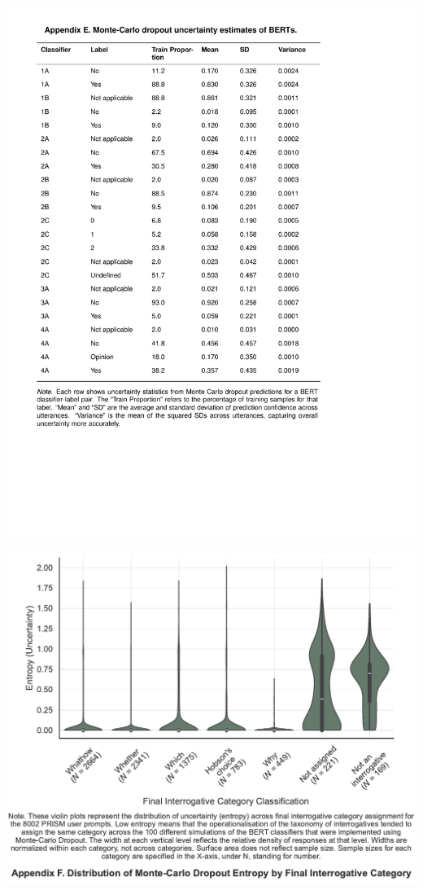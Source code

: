 \documentclass[
  12pt,
]{article}
\begin{document}
\includegraphics{../03_outputs/04_appendices/appendix_e.pdf}

\includegraphics{../03_outputs/04_appendices/appendix_f.pdf}
\end{document}
